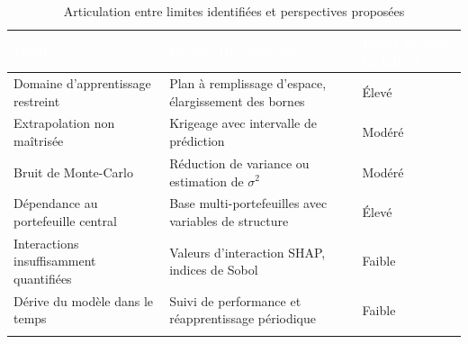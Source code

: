 \begin{table}[htbp]
\centering
\caption{Articulation entre limites identifiées et perspectives proposées}
\label{tab:limites_perspectives}
\renewcommand{\arraystretch}{1.35}
\begin{tabularx}{\textwidth}{>{\raggedright\arraybackslash}X >{\raggedright\arraybackslash}X >{\raggedright\arraybackslash}p{2.4cm}}
\arrayrulecolor{rougeCorp}\toprule
\rowcolor{rougeCorp}
\textcolor{white}{\textbf{Limite}} & \textcolor{white}{\textbf{Perspective associée}} & \textcolor{white}{\textbf{Effort de mise en œuvre}} \\
\midrule
\rowcolor{rosePale}
Domaine d'apprentissage restreint & Plan à remplissage d'espace, élargissement des bornes & Élevé \\
\rowcolor{white}
Extrapolation non maîtrisée & Krigeage avec intervalle de prédiction & Modéré \\
\rowcolor{rosePale}
Bruit de Monte-Carlo & Réduction de variance ou estimation de \(\sigma^2\) & Modéré \\
\rowcolor{white}
Dépendance au portefeuille central & Base multi-portefeuilles avec variables de structure & Élevé \\
\rowcolor{rosePale}
Interactions insuffisamment quantifiées & Valeurs d'interaction SHAP, indices de Sobol & Faible \\
\rowcolor{white}
Dérive du modèle dans le temps & Suivi de performance et réapprentissage périodique & Faible \\
\bottomrule
\arrayrulecolor{black}
\end{tabularx}
\end{table}